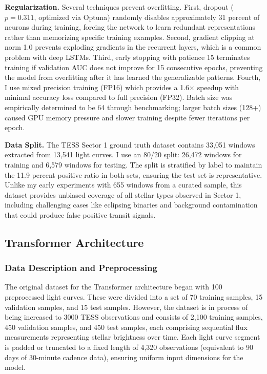 \documentclass[letterpaper]{article} %
\begin{document}
\textbf{Regularization.} Several techniques prevent overfitting. First, dropout ($p=0.311$, optimized via Optuna) randomly disables approximately 31 percent of neurons during training, forcing the network to learn redundant representations rather than memorizing specific training examples. Second, gradient clipping at norm 1.0 prevents exploding gradients in the recurrent layers, which is a common problem with deep LSTMs. Third, early stopping with patience 15 terminates training if validation AUC does not improve for 15 consecutive epochs, preventing the model from overfitting after it has learned the generalizable patterns. Fourth, I use mixed precision training (FP16) which provides a 1.6$\times$ speedup with minimal accuracy loss compared to full precision (FP32). Batch size was empirically determined to be 64 through benchmarking; larger batch sizes (128+) caused GPU memory pressure and slower training despite fewer iterations per epoch.

\textbf{Data Split.} The TESS Sector 1 ground truth dataset contains 33,051 windows extracted from 13,541 light curves. I use an 80/20 split: 26,472 windows for training and 6,579 windows for testing. The split is stratified by label to maintain the 11.9 percent positive ratio in both sets, ensuring the test set is representative. Unlike my early experiments with 655 windows from a curated sample, this dataset provides unbiased coverage of all stellar types observed in Sector 1, including challenging cases like eclipsing binaries and background contamination that could produce false positive transit signals.

\subsection{Transformer Architecture}
\subsubsection*{Data Description and Preprocessing}
The original dataset for the Transformer architecture began with 100 preprocessed light curves. These were divided into a set of 70 training samples, 15 validation samples, and 15 test samples. However, the dataset is in process of being increased to 3000 TESS observations and consists of 2,100 training samples, 450 validation samples, and 450 test samples, each comprising sequential flux measurements representing stellar brightness over time. Each light curve segment is padded or truncated to a fixed length of 4,320 observations (equivalent to 90 days of 30-minute cadence data), ensuring uniform input dimensions for the model.
\end{document}
